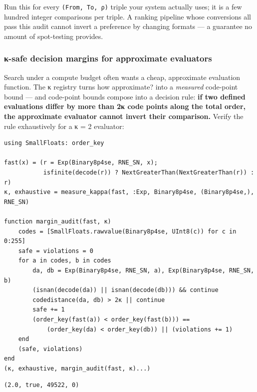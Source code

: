 Run this for every \texttt{(From, To, ρ)} triple your system actually uses; it is a few hundred integer comparisons per triple. A ranking pipeline whose conversions all pass this audit cannot invert a preference by changing formats — a guarantee no amount of spot-testing provides.



\subsubsection{κ-safe decision margins for approximate evaluators}



\label{7954056064411327915}{}


Search under a compute budget often wants a cheap, approximate evaluation function. The κ registry turns {\textquotedbl}how approximate?{\textquotedbl} into a \emph{measured} code-point bound — and code-point bounds compose into a decision rule: \textbf{if two defined evaluations differ by more than 2κ code points along the total order, the approximate evaluator cannot invert their comparison.} Verify the rule exhaustively for a κ = 2 evaluator:




\nopagebreak[4]
\begin{minipage}{\linewidth}
\begin{verbatim}
using SmallFloats: order_key

fast(x) = (r = Exp(Binary8p4se, RNE_SN, x);
           isfinite(decode(r)) ? NextGreaterThan(NextGreaterThan(r)) : r)
κ, exhaustive = measure_kappa(fast, :Exp, Binary8p4se, (Binary8p4se,), RNE_SN)

function margin_audit(fast, κ)
    codes = [SmallFloats.rawvalue(Binary8p4se, UInt8(c)) for c in 0:255]
    safe = violations = 0
    for a in codes, b in codes
        da, db = Exp(Binary8p4se, RNE_SN, a), Exp(Binary8p4se, RNE_SN, b)
        (isnan(decode(da)) || isnan(decode(db))) && continue
        codedistance(da, db) > 2κ || continue
        safe += 1
        (order_key(fast(a)) < order_key(fast(b))) ==
            (order_key(da) < order_key(db)) || (violations += 1)
    end
    (safe, violations)
end
(κ, exhaustive, margin_audit(fast, κ)...)
\end{verbatim}




\begin{verbatim}
(2.0, true, 49522, 0)
\end{verbatim}
\end{minipage}




